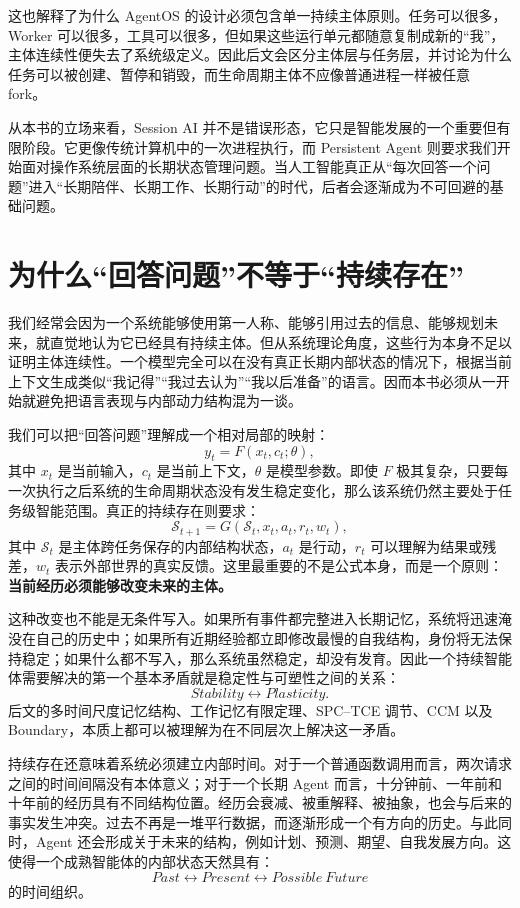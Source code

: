 这也解释了为什么 AgentOS 的设计必须包含单一持续主体原则。任务可以很多，Worker 可以很多，工具可以很多，但如果这些运行单元都随意复制成新的“我”，主体连续性便失去了系统级定义。因此后文会区分主体层与任务层，并讨论为什么任务可以被创建、暂停和销毁，而生命周期主体不应像普通进程一样被任意 fork。

从本书的立场来看，Session AI 并不是错误形态，它只是智能发展的一个重要但有限阶段。它更像传统计算机中的一次进程执行，而 Persistent Agent 则要求我们开始面对操作系统层面的长期状态管理问题。当人工智能真正从“每次回答一个问题”进入“长期陪伴、长期工作、长期行动”的时代，后者会逐渐成为不可回避的基础问题。

\section{为什么“回答问题”不等于“持续存在”}

我们经常会因为一个系统能够使用第一人称、能够引用过去的信息、能够规划未来，就直觉地认为它已经具有持续主体。但从系统理论角度，这些行为本身不足以证明主体连续性。一个模型完全可以在没有真正长期内部状态的情况下，根据当前上下文生成类似“我记得”“我过去认为”“我以后准备”的语言。因而本书必须从一开始就避免把语言表现与内部动力结构混为一谈。

我们可以把“回答问题”理解成一个相对局部的映射：
\[
y_t=F(x_t,c_t;\theta),
\]
其中 $x_t$ 是当前输入，$c_t$ 是当前上下文，$\theta$ 是模型参数。即使 $F$ 极其复杂，只要每一次执行之后系统的生命周期状态没有发生稳定变化，那么该系统仍然主要处于任务级智能范围。真正的持续存在则要求：
\[
\mathcal{S}_{t+1}
=
G(
\mathcal{S}_{t},
x_t,
a_t,
r_t,
w_t
),
\]
其中 $\mathcal{S}_t$ 是主体跨任务保存的内部结构状态，$a_t$ 是行动，$r_t$ 可以理解为结果或残差，$w_t$ 表示外部世界的真实反馈。这里最重要的不是公式本身，而是一个原则：\textbf{当前经历必须能够改变未来的主体。}

这种改变也不能是无条件写入。如果所有事件都完整进入长期记忆，系统将迅速淹没在自己的历史中；如果所有近期经验都立即修改最慢的自我结构，身份将无法保持稳定；如果什么都不写入，那么系统虽然稳定，却没有发育。因此一个持续智能体需要解决的第一个基本矛盾就是稳定性与可塑性之间的关系：
\[
Stability
\leftrightarrow
Plasticity.
\]
后文的多时间尺度记忆结构、工作记忆有限定理、SPC--TCE 调节、CCM 以及 Boundary，本质上都可以被理解为在不同层次上解决这一矛盾。

持续存在还意味着系统必须建立内部时间。对于一个普通函数调用而言，两次请求之间的时间间隔没有本体意义；对于一个长期 Agent 而言，十分钟前、一年前和十年前的经历具有不同结构位置。经历会衰减、被重解释、被抽象，也会与后来的事实发生冲突。过去不再是一堆平行数据，而逐渐形成一个有方向的历史。与此同时，Agent 还会形成关于未来的结构，例如计划、预测、期望、自我发展方向。这使得一个成熟智能体的内部状态天然具有：
\[
Past
\longleftrightarrow
Present
\longleftrightarrow
Possible\ Future
\]
的时间组织。

